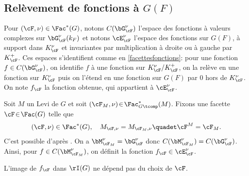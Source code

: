 \subsection{Relèvement de fonctions à \texorpdfstring{$G(F)$}{GF}}\label{relevement}
Pour $(\cF,\nu)\in \Fac^*(G)$, notons $C(\bG_{\cF}^{\nu})$ l'espace des fonctions à valeurs complexes sur $\bG_{\cF}^{\nu}(k_{F})$ et notons $\cE_{\cF}^{\nu}$ l'espace des fonctions sur $G(F)$, à support dans $K_{\cF}^{\nu}$ et invariantes par multiplication à droite ou à gauche par $K_{\cF}^+$. Ces espaces s'identifient comme en \ref{facettesfonctions}: pour une fonction $f\in C(\bG_{\cF}^{\nu})$, on identifie $f$ à une fonction sur $K_{\cF}^{\nu}/K_{\cF}^+$, on la relève en une fonction sur $K_{\cF}^{\nu}$ puis on l'étend en une fonction sur $G(F)$ par $0$ hors de $K_{\cF}^{\nu}$. On note $f_{\cF}$ la fonction obtenue, qui appartient à $\cE_{\cF}^{\nu}$.

Soit $M$ un Levi de $G$ et soit $(\cF_{M},\nu)\!\in\!\Fac^*_{G\tcomp}(M)$. Fixons une facette $\cF\!\in\!\Fac(G)$ telle que
\[
(\cF,\nu)\in \Fac^*(G),\quad M_{\cF,\nu}=M_{\cF_{M},\nu}\quadet \cF^M=\cF_{M}.
\]
C'est possible d'après \cite[Lem.\,6\,\&\,7]{W2}. On a $\bM_{\cF_{M}}^{\nu}=\bG_{\cF}^{\nu}$ donc $C(\bM_{\cF_{M}}^{\nu})=C(\bG_{\cF}^{\nu})$. Ainsi, pour $f\in C(\bM_{\cF_{M}}^{\nu})$, on définit la fonction $f_{\cF}\in \cE_{\cF}^{\nu}$.

\begin{lem*}
L'image de $f_{\cF}$ dans $\rI(G)$ ne dépend pas du choix de $\cF$.\end{lem*}

